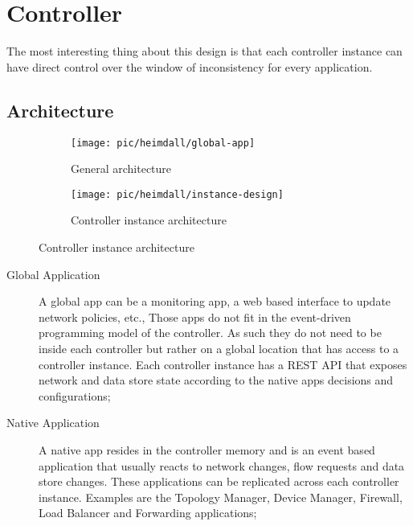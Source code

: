 

\section{Controller}
The most interesting thing about this design is that each controller instance can have direct control over the window of inconsistency for every application. 
\subsection{Architecture}

\begin{figure}[ht]
  \centering
  \begin{subfigure}[b]{0.4\textwidth}
                \centering
                \texttt{[image: pic/heimdall/global-app]}
                \caption{General architecture}
        \end{subfigure}%

        \begin{subfigure}[b]{0.7\textwidth}
                \centering
                \texttt{[image: pic/heimdall/instance-design]}
                \caption{Controller instance architecture}
        \end{subfigure}
\end{figure}



\begin{description}
\item[Global Application] A global app can be a monitoring app, a web based interface to update network policies, etc., Those apps do not fit in the event-driven programming  model of the controller.  As such they do not need to be inside each controller but rather on a global location that has access to a controller instance. Each controller instance has a REST API that exposes network and data store state according to the native apps decisions and configurations;
\item[Native Application] A native app resides in the controller memory and is an event based application that usually reacts to network changes, flow requests and data store changes. These applications can be replicated across each controller instance. Examples are the Topology Manager, Device Manager, Firewall, Load Balancer and Forwarding applications; 
\end{description} 

\noindent\makebox[\textwidth]{\rule{\paperwidth}{0.4pt}}

